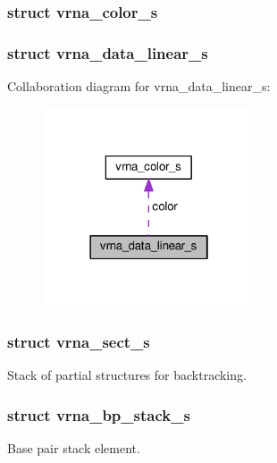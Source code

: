 \subsubsection{struct vrna\+\_\+color\+\_\+s}
\label{structvrna__data__linear__s}
\hypertarget{group__data__structures_structvrna__data__linear__s}{}
\subsubsection{struct vrna\+\_\+data\+\_\+linear\+\_\+s}


Collaboration diagram for vrna\+\_\+data\+\_\+linear\+\_\+s\+:
\nopagebreak
\begin{figure}[H]
\begin{center}
\leavevmode
\includegraphics[width=178pt]{structvrna__data__linear__s__coll__graph}
\end{center}
\end{figure}
\label{structvrna__sect__s}
\hypertarget{group__data__structures_structvrna__sect__s}{}
\subsubsection{struct vrna\+\_\+sect\+\_\+s}
Stack of partial structures for backtracking. \label{structvrna__bp__stack__s}
\hypertarget{group__data__structures_structvrna__bp__stack__s}{}
\subsubsection{struct vrna\+\_\+bp\+\_\+stack\+\_\+s}
Base pair stack element. \label{structpu__contrib}
\hypertarget{group__data__structures_structpu__contrib}{}
